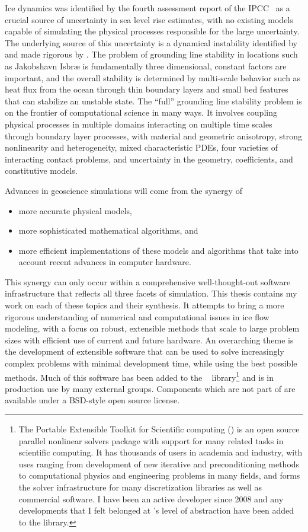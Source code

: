 Ice dynamics was identified by the fourth assessment report of the IPCC~\citep{lemk2007ar4wg1} as a crucial source of uncertainty in sea level rise estimates, with no existing models capable of simulating the physical processes responsible for the large uncertainty.
The underlying source of this uncertainty is a dynamical instability identified by \citet{weertman1974sji} and made rigorous by \citet{schoof2007isg}.
The problem of grounding line stability in locations such as Jakobshavn Isbr{\ae} is fundamentally three dimensional, constant factors are important, and the overall stability is determined by multi-scale behavior such as heat flux from the ocean through thin boundary layers and small bed features that can stabilize an unstable state.
The ``full'' grounding line stability problem is on the frontier of computational science in many ways.
It involves coupling physical processes in multiple domains interacting on multiple time scales through boundary layer processes, with material and geometric anisotropy, strong nonlinearity and heterogeneity, mixed characteristic PDEs, four varieties of interacting contact problems, and uncertainty in the geometry, coefficients, and constitutive models.

Advances in geoscience simulations will come from the synergy of
\begin{itemize}
\item more accurate physical models,
\item more sophisticated mathematical algorithms, and
\item more efficient implementations of these models and algorithms that take into account recent advances in computer hardware.
\end{itemize}
This synergy can only occur within a comprehensive well-thought-out software infrastructure that reflects all three facets of simulation.
This thesis contains my work on each of these topics and their synthesis.
It attempts to bring a more rigorous understanding of numerical and computational issues in ice flow modeling, with a focus on robust, extensible methods that scale to large problem sizes with efficient use of current and future hardware.
An overarching theme is the development of extensible software that can be used to solve increasingly complex problems with minimal development time, while using the best possible methods.
Much of this software has been added to the {\PETSc}~\citep{petsc-user-ref} library\footnote{%
The Portable Extensible Toolkit for Scientific computing ({\PETSc}) is an open source parallel nonlinear solvers package with support for many related tasks in scientific computing.
It has thousands of users in academia and industry, with uses ranging from development of new iterative and preconditioning methods to computational physics and engineering problems in many fields, and forms the solver infrastructure for many discretization libraries as well as commercial software.
I have been an active developer since 2008 and any developments that I felt belonged at {\PETSc}'s level of abstraction have been added to the library.}
and is in production use by many external groups.
Components which are not part of {\PETSc} are available under a BSD-style open source license.

